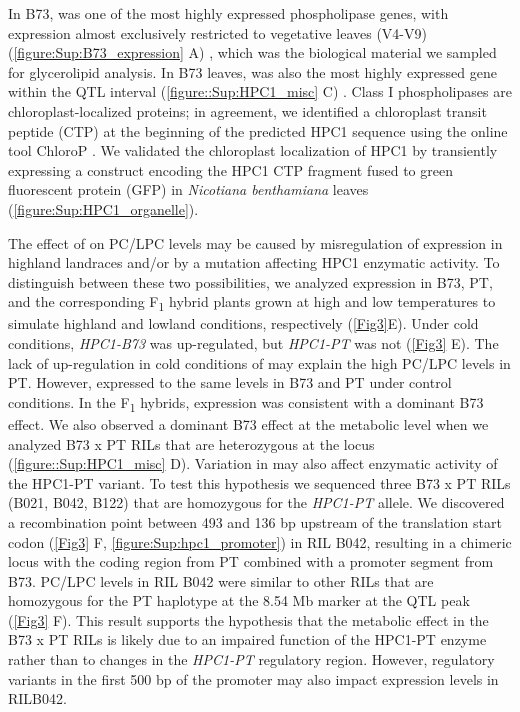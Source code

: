 In B73, \hpc was one of the most highly expressed phospholipase genes, with expression almost exclusively restricted to vegetative leaves (V4-V9) (\autoref{figure:Sup:B73_expression} A) \citep{stelpflug2016-vr}, which was the biological material we sampled for glycerolipid analysis. 
In B73 leaves, \hpc was also the most highly expressed gene within the QTL interval (\autoref{figure::Sup:HPC1_misc} C) \citep{stelpflug2016-vr}.
Class I phospholipases are chloroplast-localized proteins; in agreement, we identified a chloroplast transit peptide (CTP) at the beginning of the predicted HPC1 sequence using the online tool ChloroP \citep{emanuelsson1999-rs}.
We validated the chloroplast localization of HPC1 by transiently expressing a construct encoding the HPC1 CTP fragment fused to green fluorescent protein (GFP) in \textit{Nicotiana benthamiana} leaves (\autoref{figure:Sup:HPC1_organelle}).

The effect of \hpc on PC/LPC levels may be caused by misregulation of \hpc expression in highland landraces and/or by a mutation affecting HPC1 enzymatic activity. 
To distinguish between these two possibilities, we analyzed \hpc expression in B73, PT, and the corresponding F\textsubscript{1} hybrid plants grown at high and low temperatures to simulate highland and lowland conditions, respectively (\autoref{Fig3}E). 
Under cold conditions, \textit{HPC1-B73} was up-regulated, but \textit{HPC1-PT} was not (\autoref{Fig3} E). 
The lack of up-regulation in cold conditions of \hpc may explain the high PC/LPC levels in PT.
However, \hpc expressed to the same levels in B73 and PT under control conditions.
In the F\textsubscript{1} hybrids, \hpc expression was consistent with a dominant B73 effect.
We also observed a dominant B73 effect at the metabolic level when we analyzed B73 x PT RILs that are heterozygous at the \hpc locus
(\autoref{figure::Sup:HPC1_misc} D).
Variation in \hpc may also affect enzymatic activity of the HPC1-PT variant. 
To test this hypothesis we sequenced three B73 x PT RILs (B021, B042, B122) that are homozygous for the \textit{HPC1-PT} allele.
We discovered a recombination point between 493 and 136 bp upstream of the \hpc translation start codon (\autoref{Fig3} F, \autoref{figure:Sup:hpc1_promoter}) in RIL B042, resulting in a chimeric locus with the coding region from PT combined with a promoter segment from B73.
PC/LPC levels in RIL B042 were similar to other RILs that are homozygous for the PT haplotype at the 8.54 Mb marker at the QTL peak (\autoref{Fig3} F). 
This result supports the hypothesis that the metabolic effect in the B73 x PT RILs is likely due to an impaired function of the HPC1-PT enzyme rather than to changes in the \textit{HPC1-PT} regulatory region.
However, regulatory variants in the first 500 bp of the promoter may also impact expression levels in RILB042.

